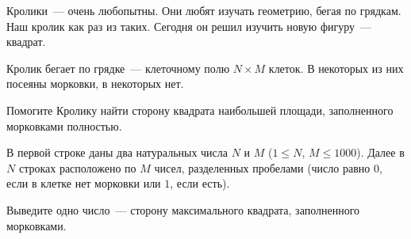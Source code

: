 

Кролики~--- очень любопытны. Они любят изучать геометрию, бегая по грядкам. Наш кролик как раз из таких. Сегодня он решил изучить новую фигуру~--- квадрат.

Кролик бегает по грядке~--- клеточному полю $N \times M$ клеток. В некоторых из них посеяны морковки, в некоторых нет. 

Помогите Кролику найти сторону квадрата наибольшей площади, заполненного морковками полностью.

\InputFile
В первой строке даны два натуральных числа $N$ и $M$ ($1 \leqslant N$, $M \leqslant 1000$).
Далее в $N$ строках расположено по $M$ чисел, разделенных пробелами (число равно $0$, если в клетке нет морковки или $1$, если есть).

\OutputFile
Выведите одно число~--- сторону максимального квадрата, заполненного морковками.

